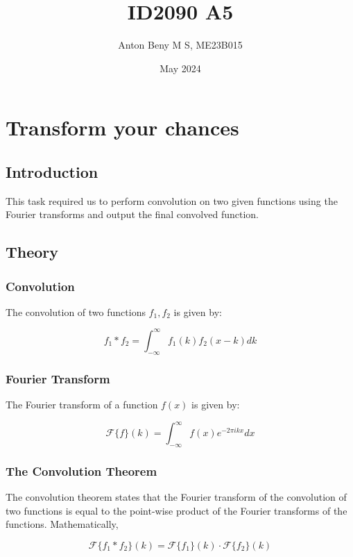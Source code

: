 \documentclass[12pt]{report}
\title{ID2090 A5}
\author{Anton Beny M S, ME23B015}
\date{May 2024}
\begin{document}
\maketitle
\newpage

\tableofcontents

\newpage

\chapter{Transform your chances}

\section{Introduction}
This task required us to perform convolution on two given functions using the Fourier transforms and output the final convolved function.

\section{Theory}

\subsection{Convolution}

The convolution \cite{enwiki:Convolution} of two functions $f_1, f_2$ is given by:

$$f_1 \ast f_2 = \int_{-\infty}^{\infty} f_1(k) f_2(x-k) dk$$

\subsection{Fourier Transform}

The Fourier transform \cite{enwiki:Fourier} of a function $f(x)$ is given by:

$$\mathcal{F}\{f\}(k) = \int_{-\infty}^{\infty} f(x) e^{-2\pi i k x} dx$$

\subsection{The Convolution Theorem}

The convolution theorem \cite{enwiki:Convolution_Theorem} states that the Fourier transform of the convolution of two functions is equal to the point-wise product of the Fourier transforms of the functions. Mathematically,

$$\mathcal{F}\{f_1 \ast f_2\}(k) = \mathcal{F}\{f_1\}(k) \cdot \mathcal{F}\{f_2\}(k)$$
\end{document}
